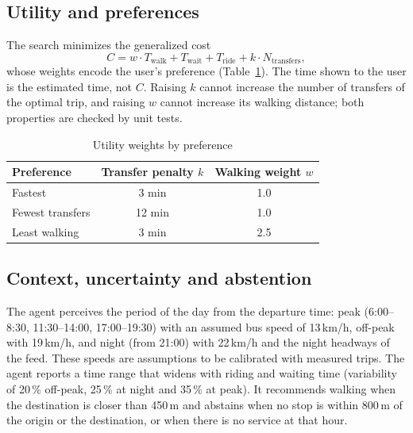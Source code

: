 \documentclass[10pt,twocolumn,letterpaper]{article}
\begin{document}
\subsection{Utility and preferences}
The search minimizes the generalized cost
\begin{equation}
C = w \cdot T_{\text{walk}} + T_{\text{wait}} + T_{\text{ride}} + k \cdot N_{\text{transfers}},
\end{equation}
whose weights encode the user's preference (Table~\ref{tab:util}). The time shown to the user is the estimated time, not $C$. Raising $k$ cannot increase the number of transfers of the optimal trip, and raising $w$ cannot increase its walking distance; both properties are checked by unit tests.

\begin{table}[t]
\caption{Utility weights by preference}\label{tab:util}
\centering\footnotesize
\begin{tabular}{@{}lcc@{}}
\toprule
Preference & Transfer penalty $k$ & Walking weight $w$ \\
\midrule
Fastest & 3 min & 1.0 \\
Fewest transfers & 12 min & 1.0 \\
Least walking & 3 min & 2.5 \\
\bottomrule
\end{tabular}
\end{table}

\subsection{Context, uncertainty and abstention}
The agent perceives the period of the day from the departure time: peak (6:00--8:30, 11:30--14:00, 17:00--19:30) with an assumed bus speed of 13\,km/h, off-peak with 19\,km/h, and night (from 21:00) with 22\,km/h and the night headways of the feed. These speeds are assumptions to be calibrated with measured trips. The agent reports a time range that widens with riding and waiting time (variability of 20\,\% off-peak, 25\,\% at night and 35\,\% at peak). It recommends walking when the destination is closer than 450\,m and abstains when no stop is within 800\,m of the origin or the destination, or when there is no service at that hour.
\end{document}

